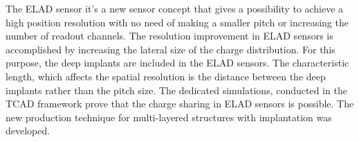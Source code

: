 The ELAD sensor it's a new sensor concept that gives a possibility to achieve a high position resolution with no need of making a smaller pitch or increasing the number of readout channels. The resolution improvement in ELAD sensors is accomplished by increasing the lateral size of the charge distribution. For this purpose, the deep implants are included in the ELAD sensors. The characteristic length, which affects the spatial resolution is the distance between the deep implants rather than the pitch size. The dedicated simulations, conducted in the TCAD framework prove that the charge sharing in ELAD sensors is possible. The new production technique for multi-layered structures with implantation was developed. 
